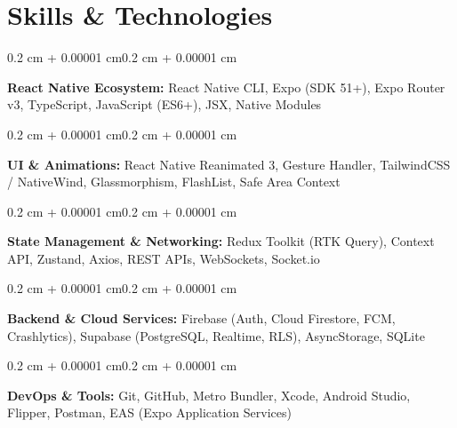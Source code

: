 \documentclass[10pt, a4paper]{article}
\newenvironment{onecolentry}{
    \begin{adjustwidth}{0.2 cm + 0.00001 cm}{0.2 cm + 0.00001 cm}
}{
    \end{adjustwidth}
}
\begin{document}
\section{Skills \& Technologies}
\begin{onecolentry}
\textbf{React Native Ecosystem:} React Native CLI, Expo (SDK 51+), Expo Router v3, TypeScript, JavaScript (ES6+), JSX, Native Modules
\end{onecolentry}
\vspace{0.10 cm}
\begin{onecolentry}
\textbf{UI \& Animations:} React Native Reanimated 3, Gesture Handler, TailwindCSS / NativeWind, Glassmorphism, FlashList, Safe Area Context
\end{onecolentry}
\vspace{0.10 cm}
\begin{onecolentry}
\textbf{State Management \& Networking:} Redux Toolkit (RTK Query), Context API, Zustand, Axios, REST APIs, WebSockets, Socket.io
\end{onecolentry}
\vspace{0.10 cm}
\begin{onecolentry}
\textbf{Backend \& Cloud Services:} Firebase (Auth, Cloud Firestore, FCM, Crashlytics), Supabase (PostgreSQL, Realtime, RLS), AsyncStorage, SQLite
\end{onecolentry}
\vspace{0.10 cm}
\begin{onecolentry}
\textbf{DevOps \& Tools:} Git, GitHub, Metro Bundler, Xcode, Android Studio, Flipper, Postman, EAS (Expo Application Services)
\end{onecolentry}
\end{document}
